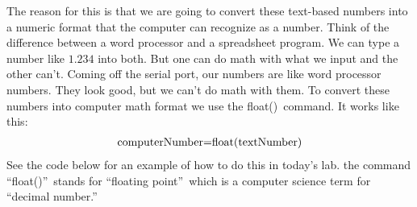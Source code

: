 The reason for this is that we are going to convert these text-based numbers
into a numeric format that the computer can recognize as a number. Think of
the difference between a word processor and a spreadsheet program. We can
type a number like $1.234$ into both. But one can do math with what we input
and the other can't. Coming off the serial port, our numbers are like word
processor numbers. They look good, but we can't do math with them. To
convert these numbers into computer math format we use the float()\ command.
It works like this:%
\begin{equation*}
\begin{tabular}{l}
computerNumber=float(textNumber)%
\end{tabular}%
\end{equation*}%
See the code below for an example of how to do this in today's lab. the
command \textquotedblleft float()\textquotedblright\ stands for
\textquotedblleft floating point\textquotedblright\ which is a computer
science term for \textquotedblleft decimal number.\textquotedblright


